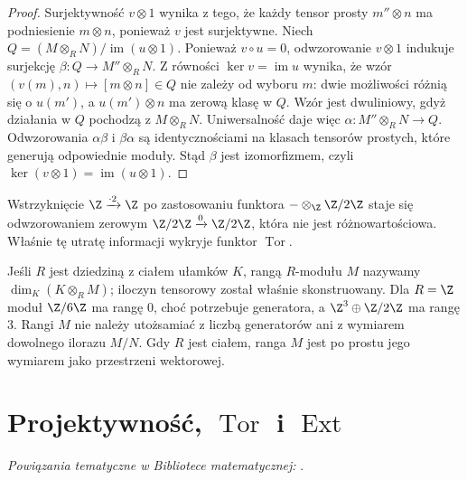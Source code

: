 \begin{proof}
Surjektywność $v\otimes1$ wynika z tego, że
każdy tensor prosty $m''\otimes n$ ma podniesienie
$m\otimes n$, ponieważ $v$ jest surjektywne.
Niech $Q=(M\otimes_RN)/\operatorname{im}(u\otimes1)$.
Ponieważ $v\circ u=0$, odwzorowanie $v\otimes1$
indukuje surjekcję $\beta:Q\to M''\otimes_RN$.
Z równości $\ker v=\operatorname{im}u$ wynika, że
wzór $(v(m),n)\mapsto[m\otimes n]\in Q$ nie zależy
od wyboru $m$: dwie możliwości różnią się o $u(m')$,
a $u(m')\otimes n$ ma zerową klasę w $Q$.
Wzór jest dwuliniowy, gdyż działania w $Q$ pochodzą
z $M\otimes_RN$. Uniwersalność daje więc
$\alpha:M''\otimes_RN\to Q$. Odwzorowania
$\alpha\beta$ i $\beta\alpha$ są identycznościami
na klasach tensorów prostych, które generują
odpowiednie moduły. Stąd $\beta$ jest izomorfizmem,
czyli $\ker(v\otimes1)=\operatorname{im}(u\otimes1)$.
\end{proof}
\begin{przyklad}
Wstrzyknięcie $\Z\xrightarrow{\cdot2}\Z$ po zastosowaniu
funktora $-\otimes_\Z\Z/2\Z$ staje się odwzorowaniem zerowym
$\Z/2\Z\xrightarrow{0}\Z/2\Z$, która nie jest różnowartościowa.
Właśnie tę utratę informacji wykryje funktor $\operatorname{Tor}$.
\end{przyklad}

\begin{uwaga}
Jeśli $R$ jest dziedziną z ciałem ułamków $K$, rangą $R$-modułu
$M$ nazywamy $\dim_K(K\otimes_R M)$; iloczyn tensorowy
został właśnie skonstruowany. Dla $R=\Z$
moduł $\Z/6\Z$ ma rangę $0$, choć potrzebuje generatora,
a $\Z^3\oplus\Z/2\Z$ ma rangę $3$.
Rangi $M$ nie należy utożsamiać z liczbą generatorów ani
z wymiarem dowolnego ilorazu $M/N$. Gdy $R$ jest ciałem,
ranga $M$ jest po prostu jego wymiarem jako przestrzeni wektorowej.
\end{uwaga}

\section{Projektywność, \texorpdfstring{$\operatorname{Tor}$ i $\operatorname{Ext}$}{Tor i Ext}}

\noindent\emph{Powiązania tematyczne w Bibliotece matematycznej:} .

